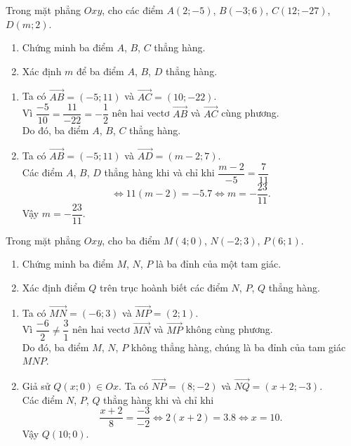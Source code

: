 \begin{vd}%
Trong mặt phẳng $Oxy$, cho các điểm $A(2;-5)$, $B(-3;6)$, $C(12;-27)$, $D(m;2)$.
\begin{enumerate}
\item Chứng minh ba điểm $A$, $B$, $C$ thẳng hàng.
\item Xác định $m$ để ba điểm $A$, $B$, $D$ thẳng hàng.
\end{enumerate}
\loigiai
{\begin{enumerate}
\item Ta có $\vec{AB}=(-5;11)$ và $\vec{AC}=(10;-22)$.\\
Vì $\dfrac{-5}{10} = \dfrac{11}{-22} = -\dfrac{1}{2}$ nên hai vectơ $\vec{AB}$ và $\vec{AC}$ cùng phương.\\ 
Do đó, ba điểm $A$, $B$, $C$ thẳng hàng.
\item Ta có $\vec{AB}=(-5;11)$ và $\vec{AD}=(m-2;7)$.\\
Các điểm $A$, $B$, $D$ thẳng hàng khi và chỉ khi $\dfrac{m-2}{-5}=\dfrac{7}{11}$ 
$$\Leftrightarrow 11(m-2)=-5.7 \Leftrightarrow m=-\dfrac{23}{11}.$$
Vậy $m=-\dfrac{23}{11}$.
\end{enumerate}}
\end{vd}
\begin{vd}%
Trong mặt phẳng $Oxy$, cho ba điểm $M(4;0)$, $N(-2;3)$, $P(6;1)$.
\begin{enumerate}
\item Chứng minh ba điểm $M$, $N$, $P$ là ba đỉnh của một tam giác.
\item Xác định điểm $Q$ trên trục hoành biết các điểm $N$, $P$, $Q$ thẳng hàng.
\end{enumerate}
\loigiai
{\begin{enumerate}
\item Ta có $\vec{MN}=(-6;3)$ và $\vec{MP}=(2;1)$.\\
Vì $\dfrac{-6}{2} \neq \dfrac{3}{1}$ nên hai vectơ $\vec{MN}$ và $\vec{MP}$ không cùng phương.\\ 
Do đó, ba điểm $M$, $N$, $P$ không thẳng hàng, chúng là ba đỉnh của tam giác $MNP$.
\item Giả sử $Q(x;0) \in Ox$. Ta có $\vec{NP}=(8;-2)$ và $\vec{NQ}=(x+2;-3)$.\\
Các điểm $N$, $P$, $Q$ thẳng hàng khi và chỉ khi 
$$\dfrac{x+2}{8}=\dfrac{-3}{-2} \Leftrightarrow 2(x+2)=3.8 \Leftrightarrow x=10.$$
Vậy $Q(10;0)$.
\end{enumerate}}
\end{vd}
